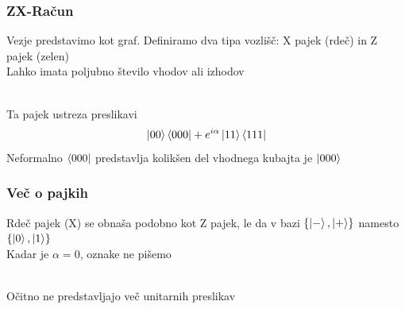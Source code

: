 \documentclass[10pt]{beamer}
\begin{document}
\begin{frame}
  \frametitle{ZX-Račun}
  Vezje predstavimo kot graf. Definiramo dva tipa vozlišč: X pajek (rdeč) in Z pajek (zelen)\\
  Lahko imata poljubno število vhodov ali izhodov\\
  \\
  Ta pajek ustreza preslikavi
  \begin{align*}
    \ket{00}\bra{000} + e^{i\alpha}\ket{11}\bra{111}
  \end{align*}
  Neformalno \(\bra{000}\) predstavlja kolikšen del vhodnega kubajta je \(\ket{000}\)
\end{frame}
\begin{frame}
  \frametitle{Več o pajkih}
  Rdeč pajek (X) se obnaša podobno kot Z pajek, le da v bazi \(\{\ket{-},\ket{+}\}\) namesto \(\{\ket0,\ket1\}\)\\
  Kadar je \(\alpha = 0\), oznake ne pišemo
  \\
  Očitno ne predstavljajo več unitarnih preslikav
\end{frame}
\end{document}
